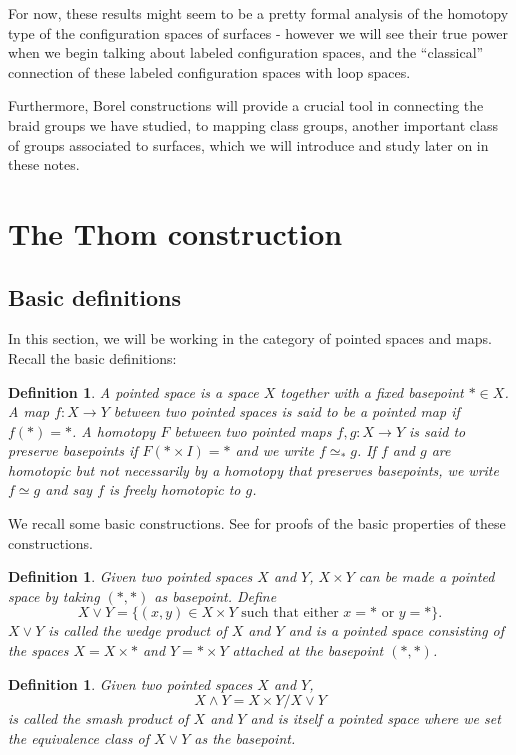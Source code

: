 \documentclass{amsart}
\newtheorem{defn}[thm]{Definition}
\begin{document}
For now, these results might seem to be a pretty formal analysis 
of the homotopy type of the configuration spaces of surfaces - however we
will see their true power when we begin talking about labeled
configuration spaces, and
the ``classical'' connection of these labeled configuration spaces with
loop spaces.

Furthermore, Borel constructions will provide a crucial tool in connecting
the braid groups we have studied, to mapping class groups, another important
class of groups associated to surfaces, which we will introduce
and study later on in these notes. 



\section{The Thom construction}

\subsection{Basic definitions}
In this section, we will be working in the category of pointed
spaces and maps. Recall the basic definitions:

\begin{defn}
A pointed space is a space $X$ together with a fixed basepoint $* \in X$.
A map $f: X \rightarrow Y$ between two pointed spaces is said to be
a pointed map if $f(*)=*$. A homotopy $F$ between two pointed maps
$f,g: X \rightarrow Y$ is said to preserve basepoints if 
$F(* \times I)=*$ and we write $f \simeq_* g$. If $f$ and $g$
are homotopic but not necessarily by a homotopy that preserves
basepoints, we write $f \simeq g$ and say $f$ is freely homotopic
to $g$. 
\end{defn}

We recall some basic constructions. See \cite{Bred} for 
proofs of the basic properties of these constructions.

\begin{defn}
Given two pointed spaces $X$ and $Y$, $X \times Y$ can be made
a pointed space by taking $(*,*)$ as basepoint. Define
$$
X \vee Y = \{ (x,y) \in X \times Y \text{ such that either }
x=* \text{ or } y=* \}.
$$
$X \vee Y$ is called the wedge product of $X$ and $Y$ and is a pointed space
consisting of the spaces $X=X \times *$ and $Y=* \times Y$ 
attached at the basepoint
$(*,*)$.
\end{defn}

\begin{defn}
Given two pointed spaces $X$ and $Y$,
$$
X \wedge Y = X \times Y / X \vee Y
$$
is called the smash product of $X$ and $Y$ and is 
itself a pointed space where we set the equivalence
class of $X \vee Y$ as the basepoint.
\end{defn}
\end{document}
